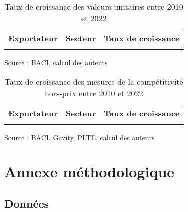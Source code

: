 \documentclass[french,10pt,a4paper]{article}
\begin{document}
\newpage

\begin{table}[!hp]
  \centering
  \begin{tabular}{lrr}
    \hline
   Exportateur & Secteur & Taux de croissance \\
    \hline
    \\
    \hline
  \end{tabular}
  \captionsetup{justification=raggedright,singlelinecheck=false, font=small}
  \caption*{Source : BACI, calcul des auteurs}
  \captionsetup{justification=centering, singlelinecheck=true, font=normalsize}
  \caption{Taux de croissance des valeurs unitaires entre 2010 et 2022}
  \label{tab:taux-croissance-uv}
\end{table}

\newpage

\begin{table}[!hp]
  \centering
  \begin{tabular}{lrr}
    \hline
   Exportateur & Secteur & Taux de croissance \\
    \hline
    \\
    \hline
  \end{tabular}
  \captionsetup{justification=justified, singlelinecheck=false, font=small}
  \caption*{Source : BACI, Gavity, PLTE, calcul des auteurs}
  \captionsetup{justification=centering, singlelinecheck=true, font=normalsize}
  \caption{Taux de croissance des mesures de la compétitivité hors-prix entre 2010 et 2022}
  \label{tab:taux-croissance-hp}
\end{table}




\newpage

\section*{Annexe méthodologique}
\subsection*{Données}
\end{document}

